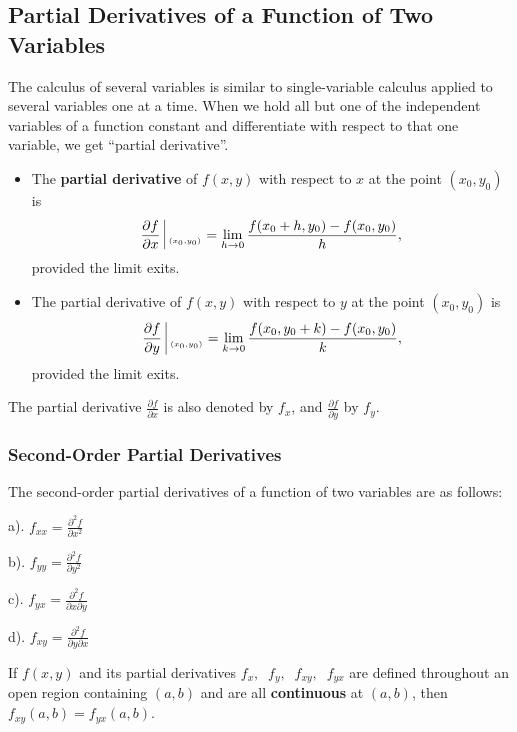 \documentclass[aima331_lecturenotes_ku.tex]{subfiles}
\begin{document}
\subsection{Partial Derivatives of a Function of Two Variables}
The calculus of several variables is similar to single-variable calculus applied to several variables one at a time. When we hold all but one of the independent variables of a function constant and differentiate with respect to that one variable, we get ``partial derivative''.

\begin{itemize}
\item The \textbf{partial derivative} of \(f(x,y)\) with respect to \(x\) at the point \((x_0,y_0)\) is
  \[\frac{\partial f}{\partial x} \;\vline \;_{_{(x_0,y_0)}} = \lim_{h \to 0} \frac{f(x_0+h,y_0)-f(x_0,y_0)}{h},\] provided the limit exits.

\item The partial derivative of \(f(x,y)\) with respect to \(y\) at the point \((x_0,y_0)\) is
  \[\frac{\partial f}{\partial y} \;\vline \;_{_{(x_0,y_0)}} = \lim_{k \to 0} \frac{f(x_0,y_0+k)-f(x_0,y_0)}{k},\] provided the limit exits.
\end{itemize}
The partial derivative \(\displaystyle \frac{\partial f}{\partial x}\) is also denoted by \(f_x\), and \(\displaystyle \frac{\partial f}{\partial y}\) by \(f_y\).

\subsubsection{Second-Order Partial Derivatives}
The second-order partial derivatives of a function of two variables are as follows:
\begin{multicols}{4}
  a). \(\displaystyle f_{xx} = \frac{\partial^2 f}{\partial x^2}\)
  \columnbreak

  b). \(\displaystyle f_{yy} = \frac{\partial^2 f}{\partial y^2}\)
  \columnbreak

  c). \(\displaystyle f_{yx} = \frac{\partial^2 f}{\partial x \partial y}\)
  \columnbreak

  d). \(\displaystyle f_{xy} = \frac{\partial^2 f}{\partial y \partial x}\)
\end{multicols}

\begin{theorem}
  If \(f(x,y)\) and its partial derivatives \(f_x, \;\; f_y, \;\; f_{xy}, \;\; f_{yx}\) are defined throughout an open region containing \((a,b)\) and are all \textbf{continuous} at \((a,b)\), then \(\displaystyle f_{xy}(a,b)=f_{yx}(a,b)\).
\end{theorem}
\end{document}
